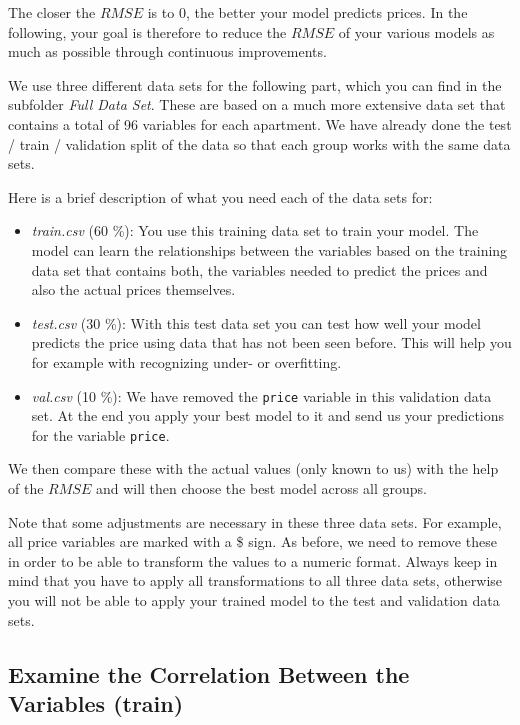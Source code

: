 \documentclass[
  11pt,
]{article}
\begin{document}
The closer the \(RMSE\) is to 0, the better your model predicts prices. In the following, your goal is therefore to reduce the \(RMSE\) of your various models as much as possible through continuous improvements.

We use three different data sets for the following part, which you can find in the subfolder \emph{Full Data Set}. These are based on a much more extensive data set that contains a total of 96 variables for each apartment. We have already done the test / train / validation split of the data so that each group works with the same data sets.

Here is a brief description of what you need each of the data sets for:

\begin{itemize}
\item
  \emph{train.csv} (60 \%): You use this training data set to train your model. The model can learn the relationships between the variables based on the training data set that contains both, the variables needed to predict the prices and also the actual prices themselves.
\item
  \emph{test.csv} (30 \%): With this test data set you can test how well your model predicts the price using data that has not been seen before. This will help you for example with recognizing under- or overfitting.
\item
  \emph{val.csv} (10 \%): We have removed the \texttt{price} variable in this validation data set. At the end you apply your best model to it and send us your predictions for the variable \texttt{price}.
\end{itemize}

We then compare these with the actual values (only known to us) with the help of the \(RMSE\) and will then choose the best model across all groups.

Note that some adjustments are necessary in these three data sets. For example, all price variables are marked with a \$ sign. As before, we need to remove these in order to be able to transform the values to a numeric format. Always keep in mind that you have to apply all transformations to all three data sets, otherwise you will not be able to apply your trained model to the test and validation data sets.

\hypertarget{examine-the-correlation-between-the-variables-train}{%
\subsection{Examine the Correlation Between the Variables (train)}\label{examine-the-correlation-between-the-variables-train}}
\end{document}
